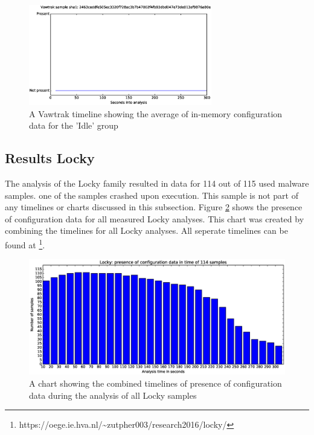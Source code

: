 \documentclass[conference]{IEEEtran}
\begin{document}
\begin{figure}[!h]
    \includegraphics[width=8cm,scale=0.5]{images/vawtrak/vawtrak-timelines-eps/Vawtrak-2463ceddfe505ec3320f728ac3b7b47002f4fb93dbd047e73de013af9876a80e.eps}
    \caption{A Vawtrak timeline showing the average of in-memory configuration data for the 'Idle' group}
    \label{fig:vawtrak-timeline-idle}
\end{figure}


\subsection{Results Locky}
The analysis of the Locky family resulted in data for 114 out of 115 used malware samples. one of the samples crashed upon execution. This sample is not part of any timelines or charts discussed in this subsection. Figure \ref{fig:locky-bar} shows the presence of configuration data for all measured Locky analyses. This chart was created by combining the timelines for all Locky analyses. All seperate timelines can be found at \footnote{https://oege.ie.hva.nl/\textasciitilde{}zutpher003/research2016/locky/}.\\



\begin{figure}[h]
	\hspace{-3cm}
    \includegraphics[width=13cm,trim=-70mm 0mm 0mm 9mm, clip=true]{images/locky/Locky-barchart.eps}
    \caption{A chart showing the combined timelines of presence of configuration data during the analysis of all Locky samples}
    \label{fig:locky-bar}
\end{figure}
\end{document}
